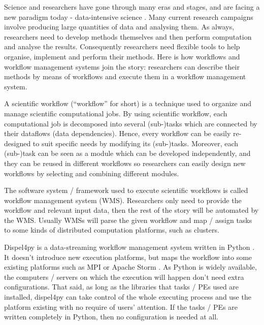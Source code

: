 \documentclass[msc,cs,logo]{infthesis}
\begin{document}
	Science and researchers have gone through many eras and stages, and are facing a new paradigm today - data-intensive science \cite{hey2009fourth}. Many current research campaigns involve producing large quantities of data and analysing them. As always, researchers need to develop methods themselves and then perform computation and analyse the results. Consequently researchers need flexible tools to help organise, implement and perform their methods. Here is how workflows and workflow management systems join the story: researchers can describe their methods by means of workflows and execute them in a workflow management system.
	
	A scientific workflow (``workflow'' for short) is a technique used to organize and manage scientific computational jobs. By using scientific workflow, each computational job is decomposed into several (sub-)tasks which are connected by their dataflows (data dependencies). Hence, every workflow can be easily re-designed to suit specific needs by modifying its (sub-)tasks. Moreover, each (sub-)task can be seen as a module which can be developed independently, and they can be reused in different workflows so researchers can easily design new workflows by selecting and combining different modules.
	
	The software system / framework used to execute scientific workflows is called workflow management system (WMS). Researchers only need to provide the workflow and relevant input data, then the rest of the story will be automated by the WMS. Usually WMSs will parse the given workflow and map / assign tasks to some kinds of distributed computation platforms, such as clusters.
	
	Dispel4py is a data-streaming workflow management system written in Python \cite{doi:10.1177/1094342016649766}. It doesn't introduce new execution platforms, but maps the workflow into some existing platforms such as MPI \cite{MPI_forum} or Apache Storm \cite{apache_storm}. As Python is widely available, the computers / servers on which the execution will happen don't need extra configurations. That said, as long as the libraries that tasks / PEs used are installed, dispel4py can take control of the whole executing process and use the platform existing with no require of users' attention. If the tasks / PEs are written completely in Python, then no configuration is needed at all.
	
\end{document}

